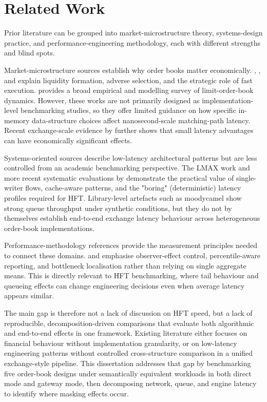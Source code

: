 \section{Related Work}
\label{sec:related_work}
Prior literature can be grouped into market-microstructure theory,
systems-design practice, and performance-engineering methodology, each with
different strengths and blind spots.

Market-microstructure sources establish why order books matter economically.
\citet{harrisequity}, \citet{aldridge2013hft}, and \citet{menkveld2013hft}
explain liquidity formation, adverse selection, and the strategic role of fast
execution. \citet{gould2013lob} provides a broad empirical and modelling survey
of limit-order-book dynamics. However, these works are not primarily designed as
implementation-level benchmarking studies, so they offer limited guidance on how
specific in-memory data-structure choices affect nanosecond-scale matching-path
latency.
Recent exchange-scale evidence by \citet{aquilina2022armsrace} further shows that
small latency advantages can have economically significant effects.

Systems-oriented sources describe low-latency architectural patterns but are
less controlled from an academic benchmarking perspective. The LMAX work
\citep{thompson2011disruptor} and more recent systematic
evaluations by \citet{bilokon2023cpp} demonstrate the practical value
of single-writer flows, cache-aware patterns, and the "boring" (deterministic) 
latency profiles required for HFT. Library-level
artefacts such as moodycamel \citep{moodycamel_concurrentqueue} show strong
queue throughput under synthetic conditions, but they do not by themselves
establish end-to-end exchange latency behaviour across heterogeneous order-book
implementations.

Performance-methodology references provide the measurement principles needed to
connect these domains. \citet{gregg2013systems} and \citet{dean2013tail}
emphasise observer-effect control, percentile-aware reporting, and bottleneck
localisation rather than relying on single aggregate means. This is directly
relevant to HFT benchmarking, where tail behaviour and queueing effects can
change engineering decisions even when average latency appears similar.

The main gap is therefore not a lack of discussion on HFT speed, but a lack
of reproducible, decomposition-driven comparisons that evaluate both
algorithmic and end-to-end effects in one framework. Existing literature either
focuses on financial behaviour without implementation granularity, or on
low-latency engineering patterns without controlled cross-structure comparison
in a unified exchange-style pipeline. This dissertation addresses that gap by
benchmarking five order-book designs under semantically equivalent workloads in
both direct mode and gateway mode, then decomposing network, queue, and engine
latency to identify where masking effects occur.
